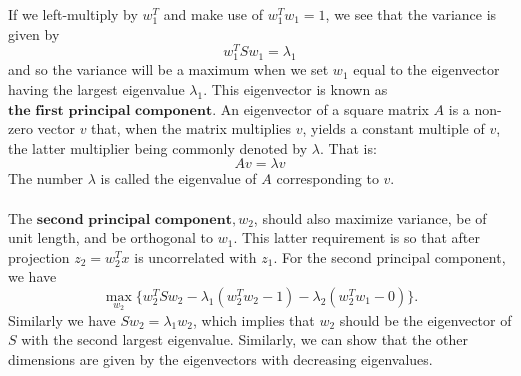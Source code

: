 \documentclass[11pt]{article}
\begin{document}
If we left-multiply by $w^T_1$ and make use of $w^T_1w_1=1$, we see that the variance is given by\begin{equation}
w_1^TSw_1 = \lambda_1
\end{equation}
and so the variance will be a maximum when we set $w_1$ equal to the eigenvector having the largest eigenvalue $\lambda_1$. This eigenvector is known as $\textbf{the first principal component}$.
An eigenvector of a square matrix $A$ is a non-zero vector $v$ that, when the matrix multiplies $v$, yields a constant multiple of $v$, the latter multiplier being commonly denoted by $\lambda$. That is:
\begin{equation}
A v = \lambda v
\end{equation}
The number $\lambda$ is called the eigenvalue of $A$ corresponding to $v$.\\
\\
The $\textbf{second principal component}, w_2$, should also maximize variance, be of unit length, and be orthogonal to $w_1$. This latter requirement is so that after projection $z_2 =w^T_2 x$ is uncorrelated with $z_1$. For the second principal component, we have\begin{equation}
\max_{w_2} \{w^T_2Sw_2-\lambda_1(w_2^T w_2-1)-\lambda_2(w_2^T w_1-0)\}.
\end{equation}
Similarly we have $Sw_2 = \lambda_1 w_2$, which implies that $w_2$ should be the eigenvector of $S$ with the second largest eigenvalue. Similarly, we can show that the other dimensions are given by the eigenvectors with decreasing eigenvalues.
\end{document}
